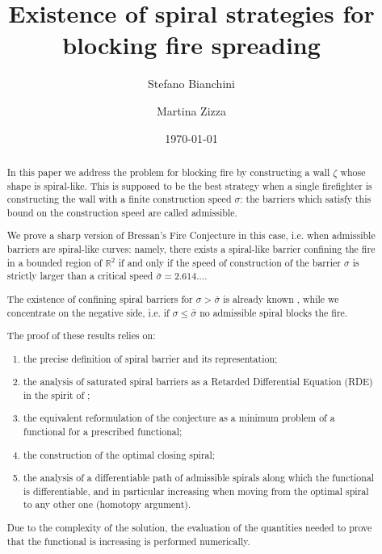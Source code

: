 \documentclass[reqno]{amsart}
\date{\today}
\title[Spiral strategies for blocking fire]{Existence of spiral strategies for blocking fire spreading}
\author{Stefano Bianchini}
\author{Martina Zizza}
\theoremstyle{definition} \newtheorem{definition}{Definition}[section]
\theoremstyle{definition} \newtheorem{remark}[definition]{Remark}
\theoremstyle{plain} \newtheorem{lemma}[definition]{Lemma}
\theoremstyle{plain} \newtheorem{proposition}[definition]{Proposition}
\theoremstyle{plain} \newtheorem{theorem}[definition]{Theorem}
\theoremstyle{plain} \newtheorem{corollary}[definition]{Corollary}
\theoremstyle{definition} \newtheorem{example}[definition]{Example}
\theoremstyle{plain} \newtheorem{claim}[clai]{Claim}
\theoremstyle{definition} \newtheorem{assumption}[definition]{Assumption}
\theoremstyle{definition} \newtheorem{observation}[definition]{Observation}
\newcommand{\R}{\mathbb{R}}
\newcommand{\1}{\mathbbm 1}
\numberwithin{equation}{section} %
\theoremstyle{plain} \newtheorem*{theorem*}{Theorem}
\theoremstyle{plain} \newtheorem{mthm}[maintheorem]{Main Theorem}
\theoremstyle{plain} \newtheorem*{mthm*}{Main Theorem}
\theoremstyle{plain} \newtheorem*{conjecture*}{Conjecture}
\theoremstyle{plain} \newtheorem{conjecture}[definition]{Conjecture}
\theoremstyle{plain} \newtheorem*{problem*}{Problem}
\begin{document}
\begin{abstract}
In this paper we address the problem for blocking fire by constructing a wall $\zeta$ whose shape is spiral-like. This is supposed to be the best strategy when a single firefighter is constructing the wall with a finite construction speed $\sigma$: the barriers which satisfy this bound on the construction speed are called admissible.

We prove a sharp version of Bressan's Fire Conjecture \cite{Bressan_conj} in this case, i.e. when admissible barriers are spiral-like curves: namely, there exists a spiral-like barrier confining the fire in a bounded region of $\R^2$ if and only if the speed of construction of the barrier $\sigma$ is strictly larger than a critical speed $\bar \sigma = 2.614...$.

The existence of confining spiral barriers for $\sigma > \bar \sigma$ is already known \cite{Bressan_friends,firefighter}, while we concentrate on the negative side, i.e. if $\sigma \leq \bar \sigma$ no admissible spiral blocks the fire.

The proof of these results relies on:
\begin{enumerate}
\item the precise definition of spiral barrier and its representation;
\item the analysis of saturated spiral barriers as a Retarded Differential Equation (RDE) in the spirit of \cite{firefighter};
\item the equivalent reformulation of the conjecture as a minimum problem of a functional  for a prescribed functional;
\item the construction of the optimal closing spiral;
\item \label{Point_5:abstract} the analysis of a differentiable path of admissible spirals along which the functional is differentiable, and in particular increasing when moving from the optimal spiral to any other one (homotopy argument).
\end{enumerate}
Due to the complexity of the solution, the evaluation of the quantities needed to prove that the functional is increasing is performed numerically.
\end{abstract}

\bigskip




\maketitle
\end{document}
